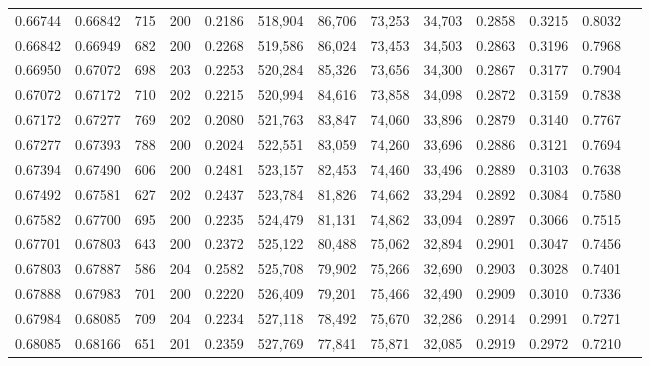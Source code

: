 \begin{tabular}{rrrrrrrrrrrrr}
0.66744 & 0.66842 &   715 & 200 &                                     0.2186 & 518,904 &  86,706 &  73,253 &  34,703 & 0.2858 & 0.3215 & 0.8032 \\
0.66842 & 0.66949 &   682 & 200 &                                     0.2268 & 519,586 &  86,024 &  73,453 &  34,503 & 0.2863 & 0.3196 & 0.7968 \\
0.66950 & 0.67072 &   698 & 203 &                                     0.2253 & 520,284 &  85,326 &  73,656 &  34,300 & 0.2867 & 0.3177 & 0.7904 \\
0.67072 & 0.67172 &   710 & 202 &                                     0.2215 & 520,994 &  84,616 &  73,858 &  34,098 & 0.2872 & 0.3159 & 0.7838 \\
0.67172 & 0.67277 &   769 & 202 &                                     0.2080 & 521,763 &  83,847 &  74,060 &  33,896 & 0.2879 & 0.3140 & 0.7767 \\
0.67277 & 0.67393 &   788 & 200 &                                     0.2024 & 522,551 &  83,059 &  74,260 &  33,696 & 0.2886 & 0.3121 & 0.7694 \\
0.67394 & 0.67490 &   606 & 200 &                                     0.2481 & 523,157 &  82,453 &  74,460 &  33,496 & 0.2889 & 0.3103 & 0.7638 \\
0.67492 & 0.67581 &   627 & 202 &                                     0.2437 & 523,784 &  81,826 &  74,662 &  33,294 & 0.2892 & 0.3084 & 0.7580 \\
0.67582 & 0.67700 &   695 & 200 &                                     0.2235 & 524,479 &  81,131 &  74,862 &  33,094 & 0.2897 & 0.3066 & 0.7515 \\
0.67701 & 0.67803 &   643 & 200 &                                     0.2372 & 525,122 &  80,488 &  75,062 &  32,894 & 0.2901 & 0.3047 & 0.7456 \\
0.67803 & 0.67887 &   586 & 204 &                                     0.2582 & 525,708 &  79,902 &  75,266 &  32,690 & 0.2903 & 0.3028 & 0.7401 \\
0.67888 & 0.67983 &   701 & 200 &                                     0.2220 & 526,409 &  79,201 &  75,466 &  32,490 & 0.2909 & 0.3010 & 0.7336 \\
0.67984 & 0.68085 &   709 & 204 &                                     0.2234 & 527,118 &  78,492 &  75,670 &  32,286 & 0.2914 & 0.2991 & 0.7271 \\
0.68085 & 0.68166 &   651 & 201 &                                     0.2359 & 527,769 &  77,841 &  75,871 &  32,085 & 0.2919 & 0.2972 & 0.7210 \\

\end{tabular}
